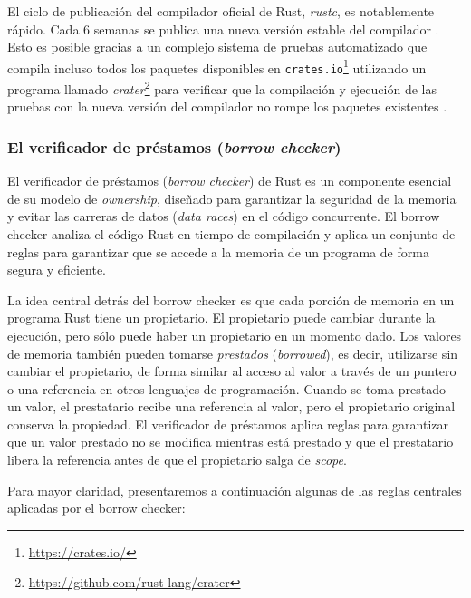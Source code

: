 El ciclo de publicación del compilador oficial de Rust, \textit{rustc}, es notablemente rápido.
Cada 6 semanas se publica una nueva versión estable del compilador \cite[Appendix G]{rust-book}.
Esto es posible gracias a un complejo sistema de pruebas automatizado que
compila incluso todos los paquetes disponibles en \texttt{crates.io}\footnote{\url{https://crates.io/}}
utilizando un programa llamado \textit{crater}\footnote{\url{https://github.com/rust-lang/crater}}
para verificar que la compilación y ejecución de las pruebas con la nueva versión del
compilador no rompe los paquetes existentes \cite{albini2019}.

\subsubsection{El verificador de préstamos (\textit{borrow checker})}

El verificador de préstamos (\textit{borrow checker}) de Rust es un componente esencial de su modelo de \textit{ownership},
diseñado para garantizar la seguridad de la memoria y evitar las carreras de datos (\textit{data races}) en el código
concurrente. El borrow checker analiza el código Rust en tiempo de compilación y
aplica un conjunto de reglas para garantizar que se accede a la memoria de un programa de
forma segura y eficiente.

La idea central detrás del borrow checker es que cada porción de memoria en un
programa Rust tiene un propietario. El propietario puede cambiar durante la ejecución, pero
sólo puede haber un propietario en un momento dado. Los valores de memoria también pueden
tomarse \emph{prestados} (\textit{borrowed}), es decir, utilizarse sin cambiar el propietario, de forma similar al acceso al
valor a través de un puntero o una referencia en otros lenguajes de programación.
Cuando se toma prestado un valor, el prestatario recibe una referencia al valor, pero el propietario original
conserva la propiedad. El verificador de préstamos aplica reglas para garantizar que un valor
prestado no se modifica mientras está prestado y que el prestatario libera la referencia antes de
que el propietario salga de \textit{scope}.

Para mayor claridad, presentaremos a continuación
algunas de las reglas centrales aplicadas por el borrow checker:

